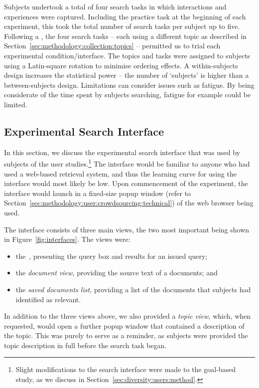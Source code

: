 Subjects undertook a total of four search tasks in which interactions and experiences were captured. Including the practice task at the beginning of each experiment, this took the total number of search tasks per subject up to five. Following a , the four search tasks -- each using a different topic as described in Section~\ref{sec:methodology:collection:topics} -- permitted us to trial each experimental condition/interface. The topics and tasks were assigned to subjects using a Latin-square rotation to minimise ordering effects. A within-subjects design increases the statistical power -- the number of `subjects' is higher than a between-subjects design. Limitations can consider issues such as fatigue. By being considerate of the time spent by subjects searching, fatigue for example could be limited.

\subsection{Experimental Search Interface}\label{sec:methodology:user:interface}
In this section, we discuss the experimental search interface that was used by subjects of the user studies.\footnote{Slight modifications to the search interface were made to the goal-based study, as we discuss in Section~\ref{sec:diversity:users:method}.} The interface would be familiar to anyone who had used a web-based retrieval system, and thus the learning curve for using the interface would most likely be low. Upon commencement of the experiment, the interface would launch in a fixed-size popup window (refer to Section~\ref{sec:methodology:user:crowdsourcing:technical}) of the web browser being used.

The interface consists of three main views, the two most important being shown in Figure~\ref{fig:interfaces}. The views were:

\begin{itemize}
    \item{the~, presenting the query box and results for an issued query;}
    \item{the \emph{document view,} providing the source text of a documents; and}
    \item{the \emph{saved documents list,} providing a list of the documents that subjects had identified as relevant.}
\end{itemize}

In addition to the three views above, we also provided a \emph{topic view,} which, when requested, would open a further popup window that contained a description of the topic. This was purely to serve as a reminder, as subjects were provided the topic description in full before the search task began.

